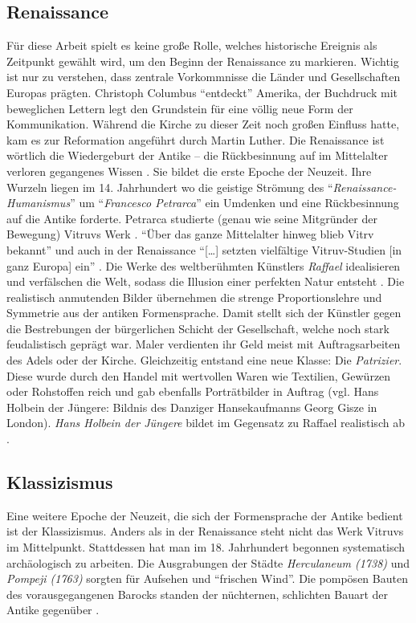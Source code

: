 \documentclass[
    a4paper,
    11pt,
    bibliography=totoc,
    listof=totoc,
    parskip=half,
    headings=normal
]{scrbook}
\begin{document}
\subsection{Renaissance}
Für diese Arbeit spielt es keine große Rolle, welches historische Ereignis als Zeitpunkt gewählt wird, um den Beginn der Renaissance zu markieren. Wichtig ist nur zu verstehen, dass zentrale Vorkommnisse die Länder und Gesellschaften Europas prägten. Christoph Columbus \enquote{entdeckt} Amerika, der Buchdruck mit beweglichen Lettern legt den Grundstein für eine völlig neue Form der Kommunikation. Während die Kirche zu dieser Zeit noch großen Einfluss hatte, kam es zur Reformation angeführt durch Martin Luther. Die Renaissance ist wörtlich die Wiedergeburt der Antike -- die Rückbesinnung auf im Mittelalter verloren gegangenes Wissen \autocite[45]{wurlStudienheftDGUT01Designgeschichte}. Sie bildet die erste Epoche der Neuzeit. Ihre Wurzeln liegen im 14. Jahrhundert wo die geistige Strömung des \enquote{\textit{Renaissance-Humanismus}} um \enquote{\textit{Francesco Petrarca}} ein Umdenken und eine Rückbesinnung auf die Antike forderte. Petrarca studierte (genau wie seine Mitgründer der Bewegung) Vitruvs Werk \autocite[Ciapponi, 1960, zitiert nach][70]{guentherDeutscheArchitekturtheorieZwischen1988}.
\enquote{Über das ganze Mittelalter hinweg blieb Vitrv bekannt} und auch in der Renaissance \enquote{[\dots] setzten vielfältige Vitruv-Studien [in ganz Europa] ein} \autocite[69\psq]{guentherDeutscheArchitekturtheorieZwischen1988}.
Die Werke des weltberühmten Künstlers \textit{Raffael} idealisieren und verfälschen die Welt, sodass die Illusion einer perfekten Natur entsteht \autocite[49]{wurlStudienheftDGUT01Designgeschichte}. Die realistisch anmutenden Bilder übernehmen die strenge Proportionslehre und Symmetrie aus der antiken Formensprache. Damit stellt sich der Künstler gegen die Bestrebungen der bürgerlichen Schicht der Gesellschaft, welche noch stark feudalistisch geprägt war. Maler verdienten ihr Geld meist mit Auftragsarbeiten des Adels oder der Kirche. Gleichzeitig entstand eine neue Klasse: Die \textit{Patrizier}. Diese wurde durch den Handel mit wertvollen Waren wie Textilien, Gewürzen oder Rohstoffen reich und gab ebenfalls Porträtbilder in Auftrag (vgl. Hans Holbein der Jüngere: Bildnis des Danziger Hansekaufmanns Georg Gisze in London). \textit{Hans Holbein der Jüngere} bildet im Gegensatz zu Raffael realistisch ab \autocite[45\psq]{wurlStudienheftDGUT01Designgeschichte}.

\subsection{Klassizismus}
Eine weitere Epoche der Neuzeit, die sich der Formensprache der Antike bedient ist der Klassizismus. Anders als in der Renaissance steht nicht das Werk Vitruvs im Mittelpunkt. Stattdessen hat man im 18. Jahrhundert begonnen systematisch archäologisch zu arbeiten. Die Ausgrabungen der Städte \textit{Herculaneum (1738)} und \textit{Pompeji (1763)} sorgten für Aufsehen und \enquote{frischen Wind}. Die pompösen Bauten des vorausgegangenen Barocks standen der nüchternen, schlichten Bauart der Antike gegenüber \autocite[56]{wurlStudienheftDGUT01Designgeschichte}.
\end{document}
